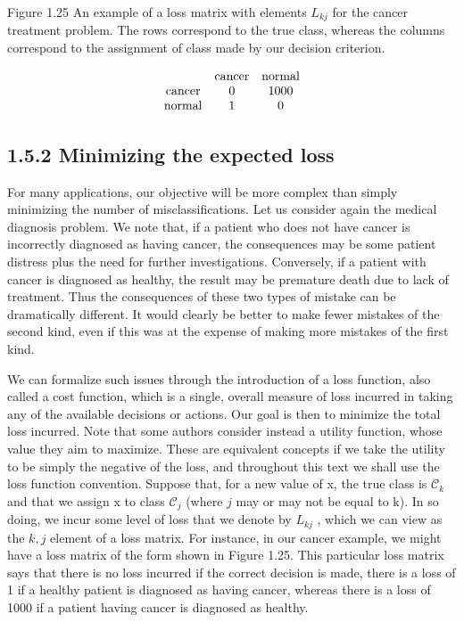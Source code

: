 \documentclass[
  10
]{article}
\begin{document}
Figure 1.25 An example of a loss matrix with elements \(L _ { k j }\)
for the cancer treatment problem. The rows correspond to the true class,
whereas the columns correspond to the assignment of class made by our
decision criterion.

\[
\begin{array}{c c c} & \text {cancer} & \text {normal} \\ \text {cancer} & 0 & 1 0 0 0 \\ \text {normal} & 1 & 0 \end{array}
\]

\subsection{1.5.2 Minimizing the expected
loss}\label{minimizing-the-expected-loss}

For many applications, our objective will be more complex than simply
minimizing the number of misclassifications. Let us consider again the
medical diagnosis problem. We note that, if a patient who does not have
cancer is incorrectly diagnosed as having cancer, the consequences may
be some patient distress plus the need for further investigations.
Conversely, if a patient with cancer is diagnosed as healthy, the result
may be premature death due to lack of treatment. Thus the consequences
of these two types of mistake can be dramatically different. It would
clearly be better to make fewer mistakes of the second kind, even if
this was at the expense of making more mistakes of the first kind.

We can formalize such issues through the introduction of a loss
function, also called a cost function, which is a single, overall
measure of loss incurred in taking any of the available decisions or
actions. Our goal is then to minimize the total loss incurred. Note that
some authors consider instead a utility function, whose value they aim
to maximize. These are equivalent concepts if we take the utility to be
simply the negative of the loss, and throughout this text we shall use
the loss function convention. Suppose that, for a new value of x, the
true class is \(\mathcal { C } _ { k }\) and that we assign x to class
\(\mathcal { C } _ { j }\) (where \(j\) may or may not be equal to k).
In so doing, we incur some level of loss that we denote by
\(L _ { k j }\) , which we can view as the \(k , j\) element of a loss
matrix. For instance, in our cancer example, we might have a loss matrix
of the form shown in Figure 1.25. This particular loss matrix says that
there is no loss incurred if the correct decision is made, there is a
loss of 1 if a healthy patient is diagnosed as having cancer, whereas
there is a loss of 1000 if a patient having cancer is diagnosed as
healthy.
\end{document}

